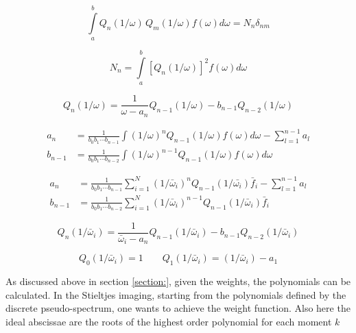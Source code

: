 \begin{equation}
  \int\limits_a^b Q_n(1/\omega) \, Q_m(1/\omega) f(\omega) d\omega = N_n \delta_{nm}
\end{equation}

\begin{equation}
  N_n = \int\limits_a^b \left[ Q_n(1/\omega) \right]^2 f(\omega) d\omega
\end{equation}

\begin{equation}
  Q_n(1/\omega) = \frac{1}{\omega - a_n} Q_{n-1}(1/\omega) - b_{n-1} Q_{n-2}(1/\omega)
\end{equation}

\begin{align}
  a_n     &= \frac{1}{b_0b_1\cdots b_{n-1}}
             \int (1/\omega)^n Q_{n-1}(1/\omega) f(\omega) d\omega
             - \sum\limits_{l=1}^{n-1} a_l \\
  b_{n-1} &= \frac{1}{b_0b_1\cdots b_{n-2}}
             \int (1/\omega)^{n-1} Q_{n-1}(1/\omega) f(\omega) d\omega
\end{align}

\begin{align}
  a_n     &= \frac{1}{b_0b_1\cdots b_{n-1}}
             \sum\limits_{i=1}^N
               (1/\bar{\omega}_i)^n Q_{n-1}(1/\bar{\omega_i}) \bar{f}_i
             - \sum\limits_{l=1}^{n-1} a_l \\
  b_{n-1} &= \frac{1}{b_0b_1\cdots b_{n-2}}
             \sum\limits_{i=1}^N
               (1/\bar{\omega}_i)^{n-1} Q_{n-1}(1/\bar{\omega}_i) \bar{f}_i
\end{align}

\begin{equation}
  Q_n(1/\bar{\omega}_i) = \frac{1}{\bar{\omega}_i - a_n} Q_{n-1}(1/\bar{\omega}_i)
                          - b_{n-1} Q_{n-2}(1/\bar{\omega}_i)
\end{equation}

\begin{equation}
  Q_0(1/\bar{\omega}_i) = 1 \quad\quad Q_1(1/\bar{\omega}_i) = (1/\bar{\omega}_i) - a_1
\end{equation}


As discussed above in section \ref{section:}, given the weights, the polynomials
can be calculated. In the Stieltjes imaging, starting from the polynomials
defined by the discrete pseudo-spectrum, one wants to achieve the weight function.
Also here the ideal abscissae are the roots of the highest order polynomial
for each moment $k$

